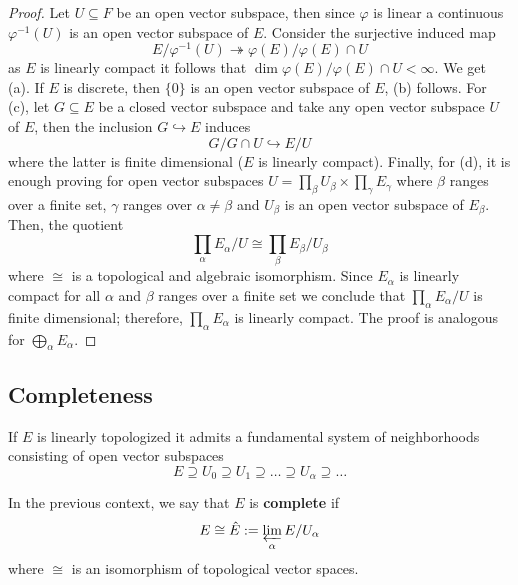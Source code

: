\begin{proof}
	Let $U \subseteq F$ be an open vector subspace, then since $\varphi$ is linear a continuous $\varphi^{-1}(U)$ is an open vector subspace of $E$. Consider the surjective induced map 
	\[
		E/\varphi^{-1}(U) \twoheadrightarrow \varphi(E)/\varphi(E)\cap U
	\]
	as $E$ is linearly compact it follows that $\dim \varphi(E)/\varphi(E)\cap U < \infty$. We get (a). If $E$ is discrete, then $\{0\}$ is an open vector subspace of $E$, (b) follows. For (c), let $G \subseteq E$ be a closed vector subspace and take any open vector subspace $U$ of $E$, then the inclusion $G \hookrightarrow E$ induces
	\[
		G/G \cap U \hookrightarrow E/U
	\]
	where the latter is finite dimensional ($E$ is linearly compact). Finally, for (d), it is enough proving for open vector subspaces $U = \prod_{\beta} U_{\beta} \times \prod_{\gamma} E_{\gamma}$ where $\beta$ ranges over a finite set, $\gamma$ ranges over $\alpha \neq \beta$ and $U_{\beta}$ is an open vector subspace of $E_{\beta}$. Then, the quotient
	\[
		\prod_{\alpha}E_{\alpha} / U \cong \prod_{\beta} E_{\beta}/U_{\beta}
	\]
	where $\cong$ is a topological and algebraic isomorphism. Since $E_{\alpha}$ is linearly compact for all $\alpha$ and $\beta$ ranges over a finite set we conclude that $\prod_{\alpha} E_{\alpha} / U$ is finite dimensional; therefore, $\prod_{\alpha} E_{\alpha}$ is linearly compact. The proof is analogous for $\bigoplus_{\alpha} E_{\alpha}$.
\end{proof}
\subsection*{Completeness}
If $E$ is linearly topologized it admits a fundamental system of neighborhoods consisting of open vector subspaces 
\[
	E \supseteq U_{0} \supseteq U_{1} \supseteq \ldots \supseteq U_{\alpha} \supseteq \ldots
\]
\begin{definition}\label{compleness-inverse-limit}
	In the previous context, we say that $E$ is \textbf{complete} if 
	\[
		E \cong \hat{E} := \varprojlim_{\alpha} E/U_{\alpha}
	\]
	where $\cong$ is an isomorphism of topological vector spaces.
\end{definition}
